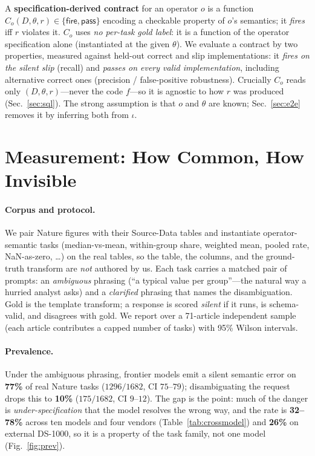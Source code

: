\documentclass[10pt,twocolumn,letterpaper]{article}
\begin{document}
A \textbf{specification-derived contract} for an operator $o$ is a function
$C_o(D,\theta,r)\in\{\textsf{fire},\textsf{pass}\}$ encoding a checkable property
of $o$'s semantics; it \emph{fires} iff $r$ violates it. $C_o$ uses \emph{no
per-task gold label}: it is a function of the operator specification alone
(instantiated at the given $\theta$). We evaluate a contract by two properties,
measured against held-out correct and slip implementations: it \emph{fires on
the silent slip} (recall) and \emph{passes on every valid implementation},
including alternative correct ones (precision / false-positive robustness).
Crucially $C_o$ reads only $(D,\theta,r)$---never the code $f$---so it is
agnostic to how $r$ was produced (Sec.~\ref{sec:sql}). The strong assumption is
that $o$ and $\theta$ are known; Sec.~\ref{sec:e2e} removes it by inferring both
from $\iota$.

\section{Measurement: How Common, How Invisible}\label{sec:measure}
\paragraph{Corpus and protocol.} We pair Nature figures with their Source-Data
tables and instantiate operator-semantic tasks (median-vs-mean, within-group
share, weighted mean, pooled rate, NaN-as-zero, \dots) on the real tables, so
the table, the columns, and the ground-truth transform are \emph{not} authored
by us. Each task carries a matched pair of prompts: an \emph{ambiguous} phrasing
(``a typical value per group''---the natural way a hurried analyst asks) and a
\emph{clarified} phrasing that names the disambiguation. Gold is the template
transform; a response is scored \emph{silent} if it runs, is schema-valid, and
disagrees with gold. We report over a 71-article independent sample (each
article contributes a capped number of tasks) with 95\% Wilson intervals.

\paragraph{Prevalence.} Under the ambiguous phrasing, frontier models emit a
silent semantic error on \textbf{77\%} of real Nature tasks
($1296/1682$, CI $75$--$79$); disambiguating the request drops this to
\textbf{10\%} ($175/1682$, CI $9$--$12$). The gap is the point: much of the
danger is \emph{under-specification} that the model resolves the wrong way, and
the rate is \textbf{32--78\%} across ten models and four vendors
(Table~\ref{tab:crossmodel}) and \textbf{26\%}
on external DS-1000, so it is a property of the task family, not one model
(Fig.~\ref{fig:prev}).
\end{document}
